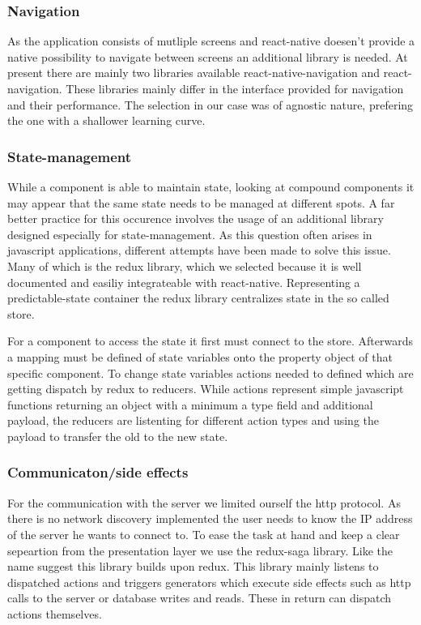 \documentclass[conference]{IEEEtran}
\begin{document}

\subsubsection{Navigation}
As the application consists of mutliple screens and react-native doesen't provide a native possibility to navigate between screens an additional
library is needed. At present there are mainly two libraries available react-native-navigation and react-navigation. These libraries mainly differ
in the interface provided for navigation and their performance. The selection in our case was of agnostic nature, prefering the one with a
shallower learning curve. 

\subsubsection{State-management}
While a component is able to maintain state, looking at compound components it may appear that the same state needs to be managed at different
spots. A far better practice for this occurence involves the usage of an additional library designed especially for state-management. As this
question often arises in javascript applications, different attempts have been made to solve this issue. Many of which is the redux library,
which we selected because it is well documented and easiliy integrateable with react-native. Representing a predictable-state container the redux
library centralizes state in the so called store. 

For a component to access the state it first must connect to the store. Afterwards a mapping must be defined of state variables onto the property 
object of that specific component. To change state variables actions needed to defined which are getting dispatch by redux to reducers. While actions
represent simple javascript functions returning an object with a minimum a type field and additional payload, the reducers are listenting for
different action types and using the payload to transfer the old to the new state. 

\subsubsection{Communicaton/side effects}
For the communication with the server we limited ourself the http protocol. As there is no network discovery implemented the user needs to know the
IP address of the server he wants to connect to. To ease the task at hand and keep a clear sepeartion from the presentation layer we use the 
redux-saga library. Like the name suggest this library builds upon redux. This library mainly listens to dispatched actions and triggers generators
which execute side effects such as http calls to the server or database writes and reads. These in return can dispatch actions themselves.
\end{document}

